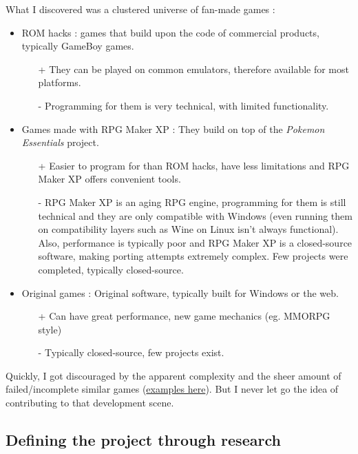 \documentclass[11pt]{article}
\begin{document}
What I discovered was a clustered universe of fan-made games :
\begin{itemize}
	\item ROM hacks : games that build upon the code of commercial products, typically GameBoy games.
	\begin{itemize}
		\item[+] They can be played on common emulators, therefore available for most platforms.
		\item[-] Programming for them is very technical, with limited functionality.
	\end{itemize}
	
	\item Games made with RPG Maker XP : They build on top of the \textit{Pokemon Essentials} project.
	
	\begin{itemize}
		\item[+] Easier to program for than ROM hacks, have less limitations and RPG Maker XP offers convenient tools.
		
		\item[-] RPG Maker XP is an aging RPG engine, programming for them is still technical and they are only compatible with Windows (even running them on compatibility layers such as Wine on Linux isn't always functional). Also, performance is typically poor and RPG Maker XP is a closed-source software, making porting attempts extremely complex. Few projects were completed, typically closed-source.
	\end{itemize}

	\item Original games : Original software, typically built for Windows or the web.
	\begin{itemize}
		\item[+] Can have great performance, new game mechanics (eg. MMORPG style)
		\item[-] Typically closed-source, few projects exist.
	\end{itemize}
\end{itemize}

Quickly, I got discouraged by the apparent complexity and the sheer amount of failed/incomplete similar games (\href{https://pokemon-fan-game.fandom.com/wiki/Category:Incomplete_Games}{examples here}). But I never let go the idea of contributing to that development scene.


\subsection{Defining the project through research}
\end{document}
